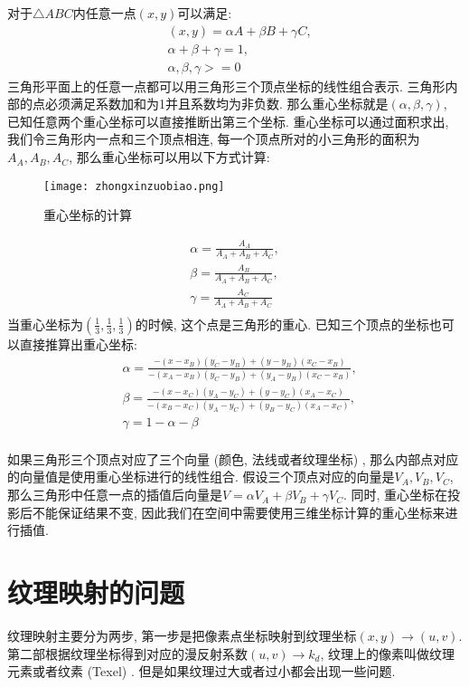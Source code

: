 \documentclass[openany]{progbookcn}
\begin{document}
对于$\triangle ABC$内任意一点$(x,y)$可以满足: 
\begin{equation}
	\begin{split}
		&(x,y) = \alpha A + \beta B + \gamma C, \\
		&\alpha + \beta + \gamma = 1,\\
		& \alpha, \beta, \gamma >= 0
	\end{split}
\end{equation}
三角形平面上的任意一点都可以用三角形三个顶点坐标的线性组合表示. 三角形内部的点必须满足系数加和为1并且系数均为非负数. 那么重心坐标就是$(\alpha,\beta,\gamma)$, 已知任意两个重心坐标可以直接推断出第三个坐标. 
重心坐标可以通过面积求出, 我们令三角形内一点和三个顶点相连, 每一个顶点所对的小三角形的面积为$A_A,A_B,A_C$, 那么重心坐标可以用以下方式计算: 
\begin{figure}[H]
	\centering
	\texttt{[image: zhongxinzuobiao.png]}
	\caption{重心坐标的计算}
	\label{fig:zongxinzuobiao}
\end{figure}
\begin{equation}
	\begin{split}
		\alpha = \frac{A_A}{A_A+A_B+A_C},\\
		\beta = \frac{A_B}{A_A+A_B+A_C},\\
		\gamma = \frac{A_C}{A_A+A_B+A_C}\\
	\end{split}
\end{equation}
当重心坐标为$(\frac{1}{3},\frac{1}{3},\frac{1}{3})$的时候, 这个点是三角形的重心. 已知三个顶点的坐标也可以直接推算出重心坐标: 
\begin{equation}
	\begin{split}
		&\alpha = \frac{-(x-x_B)(y_C-y_B) + (y-y_B)(x_C-x_B)}{-(x_A-x_B)(y_C-y_B) + (y_A-y_B)(x_C-x_B)},\\
		&\beta =  \frac{-(x-x_C)(y_A-y_C) + (y-y_C)(x_A-x_C)}{-(x_B-x_C)(y_A-y_C) + (y_B-y_C)(x_A-x_C)},\\
		&\gamma = 1-\alpha-\beta\\
	\end{split}
\end{equation}

如果三角形三个顶点对应了三个向量 (颜色, 法线或者纹理坐标) , 那么内部点对应的向量值是使用重心坐标进行的线性组合. 假设三个顶点对应的向量是$V_A,V_B,V_C$, 那么三角形中任意一点的插值后向量是$V=\alpha V_A +\beta V_B+\gamma V_C$. 同时, 重心坐标在投影后不能保证结果不变, 因此我们在空间中需要使用三维坐标计算的重心坐标来进行插值. 

\section{纹理映射的问题}
纹理映射主要分为两步, 第一步是把像素点坐标映射到纹理坐标$(x,y)\rightarrow (u,v)$. 第二部根据纹理坐标得到对应的漫反射系数$(u,v)\rightarrow k_d$, 纹理上的像素叫做纹理元素或者纹素 (Texel) . 但是如果纹理过大或者过小都会出现一些问题. 
\end{document}
